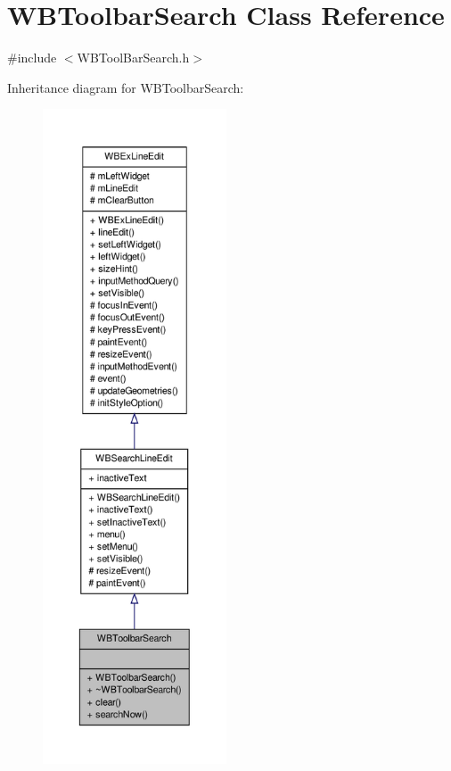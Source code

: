 \hypertarget{class_w_b_toolbar_search}{\section{W\-B\-Toolbar\-Search Class Reference}
\label{d0/d5b/class_w_b_toolbar_search}
}


{\ttfamily \#include $<$W\-B\-Tool\-Bar\-Search.\-h$>$}



Inheritance diagram for W\-B\-Toolbar\-Search\-:
\nopagebreak
\begin{figure}[H]
\begin{center}
\leavevmode
\includegraphics[height=550pt]{df/d2a/class_w_b_toolbar_search__inherit__graph}
\end{center}
\end{figure}


